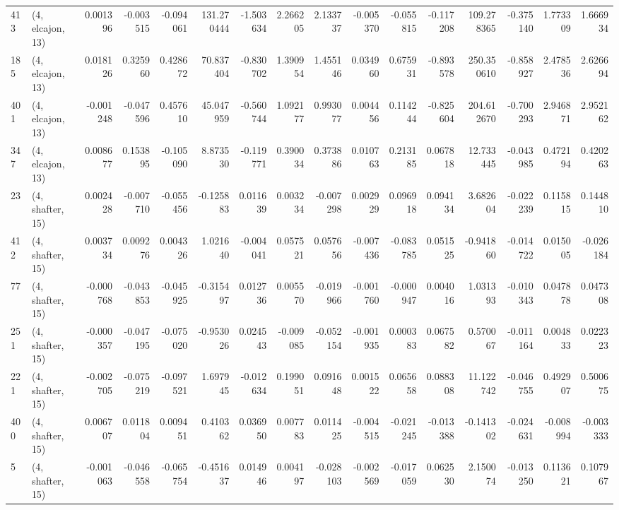 \begin{tabular}{llrrrrrrrrrrrrrr}
413 &  (4, elcajon, 13) &   0.001396 & -0.003515 & -0.094061 &  131.270444 & -1.503634 &   2.266205 &  2.133737 & -0.005370 & -0.055815 & -0.117208 &  109.278365 & -0.375140 &  1.773309 &  1.666934 \\
185 &  (4, elcajon, 13) &   0.018126 &  0.325960 &  0.428672 &   70.837404 & -0.830702 &   1.390954 &  1.455146 &  0.034960 &  0.675931 & -0.893578 &  250.350610 & -0.858927 &  2.478536 &  2.626694 \\
401 &  (4, elcajon, 13) &  -0.001248 & -0.047596 &  0.457610 &   45.047959 & -0.560744 &   1.092177 &  0.993077 &  0.004456 &  0.114244 & -0.825604 &  204.612670 & -0.700293 &  2.946871 &  2.952162 \\
347 &  (4, elcajon, 13) &   0.008677 &  0.153895 & -0.105090 &    8.873530 & -0.119771 &   0.390034 &  0.373886 &  0.010763 &  0.213185 &  0.067818 &   12.733445 & -0.043985 &  0.472194 &  0.420263 \\
23  &  (4, shafter, 15) &   0.002428 & -0.007710 & -0.055456 &   -0.125883 &  0.011639 &   0.003234 & -0.007298 &  0.002929 &  0.096918 &  0.094134 &    3.682604 & -0.022239 &  0.115815 &  0.144810 \\
412 &  (4, shafter, 15) &   0.003734 &  0.009276 &  0.004326 &    1.021640 & -0.004041 &   0.057521 &  0.057656 & -0.007436 & -0.083785 &  0.051525 &   -0.941860 & -0.014722 &  0.015005 & -0.026184 \\
77  &  (4, shafter, 15) &  -0.000768 & -0.043853 & -0.045925 &   -0.315497 &  0.012736 &   0.005570 & -0.019966 & -0.001760 & -0.000947 &  0.004016 &    1.031393 & -0.010343 &  0.047878 &  0.047308 \\
251 &  (4, shafter, 15) &  -0.000357 & -0.047195 & -0.075020 &   -0.953026 &  0.024543 &  -0.009085 & -0.052154 & -0.001935 &  0.000383 &  0.067582 &    0.570067 & -0.011164 &  0.004833 &  0.022323 \\
221 &  (4, shafter, 15) &  -0.002705 & -0.075219 & -0.097521 &    1.697945 & -0.012634 &   0.199051 &  0.091648 &  0.001522 &  0.065658 &  0.088308 &   11.122742 & -0.046755 &  0.492907 &  0.500675 \\
400 &  (4, shafter, 15) &   0.006707 &  0.011804 &  0.009451 &    0.410362 &  0.036950 &   0.007783 &  0.011425 & -0.004515 & -0.021245 & -0.013388 &   -0.141302 & -0.024631 & -0.008994 & -0.003333 \\
5   &  (4, shafter, 15) &  -0.001063 & -0.046558 & -0.065754 &   -0.451637 &  0.014946 &   0.004197 & -0.028103 & -0.002569 & -0.017059 &  0.062530 &    2.150074 & -0.013250 &  0.113621 &  0.107967 \\

\end{tabular}
